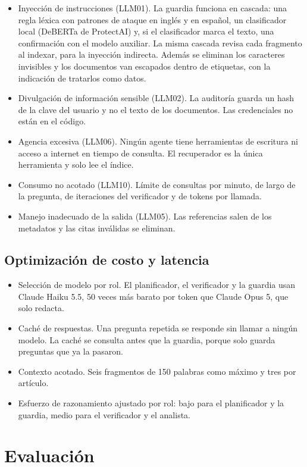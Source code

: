 \documentclass[11pt,a4paper]{article}
\begin{document}
\begin{itemize}
\item Inyección de instrucciones (LLM01). La guardia funciona en cascada: una regla léxica con
patrones de ataque en inglés y en español, un clasificador local (DeBERTa de ProtectAI) y, si el
clasificador marca el texto, una confirmación con el modelo auxiliar. La misma cascada revisa cada
fragmento al indexar, para la inyección indirecta. Además se eliminan los caracteres invisibles y los
documentos van escapados dentro de etiquetas, con la indicación de tratarlos como datos.
\item Divulgación de información sensible (LLM02). La auditoría guarda un hash de la clave del
usuario y no el texto de los documentos. Las credenciales no están en el código.
\item Agencia excesiva (LLM06). Ningún agente tiene herramientas de escritura ni acceso a internet en
tiempo de consulta. El recuperador es la única herramienta y solo lee el índice.
\item Consumo no acotado (LLM10). Límite de consultas por minuto, de largo de la pregunta, de
iteraciones del verificador y de tokens por llamada.
\item Manejo inadecuado de la salida (LLM05). Las referencias salen de los metadatos y las citas
inválidas se eliminan.
\end{itemize}

\subsection{Optimización de costo y latencia}

\begin{itemize}
\item Selección de modelo por rol. El planificador, el verificador y la guardia usan Claude Haiku 5.5,
50 veces más barato por token que Claude Opus 5, que solo redacta.
\item Caché de respuestas. Una pregunta repetida se responde sin llamar a ningún modelo. La caché se
consulta antes que la guardia, porque solo guarda preguntas que ya la pasaron.
\item Contexto acotado. Seis fragmentos de 150 palabras como máximo y tres por artículo.
\item Esfuerzo de razonamiento ajustado por rol: bajo para el planificador y la guardia, medio para el
verificador y el analista.
\end{itemize}

\section{Evaluación}
\end{document}

